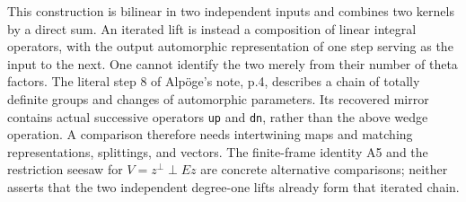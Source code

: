\documentclass[11pt]{article}
\begin{document}
This construction is bilinear in two independent inputs and combines
two kernels by a direct sum. An iterated lift is instead a composition
of linear integral operators, with the output automorphic
representation of one step serving as the input to the next. One
cannot identify the two merely from their number of theta factors.
The literal step 8 of Alp\"oge's note, p.4, describes a chain of
totally definite groups and changes of automorphic parameters. Its
recovered mirror contains actual successive operators \texttt{up}
and \texttt{dn}, rather than the above wedge operation. A comparison
therefore needs intertwining maps and matching representations,
splittings, and vectors. The finite-frame identity A5 and the
restriction seesaw for $V=z^\perp\perp Ez$ are concrete alternative
comparisons; neither asserts that the two independent degree-one
lifts already form that iterated chain.
\end{document}
